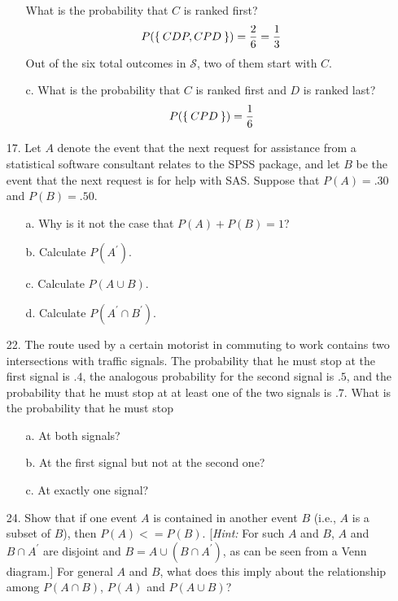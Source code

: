 \documentclass[letterpaper,12pt]{article}
\begin{document}
\begin{enumerate}
\begin{enumerate}
        What is the probability that $C$ is ranked first?
        \begin{align*}
          P(\Set{CDP, CPD}) = \frac{2}{6} = \frac{1}{3}
        \end{align*}
        Out of the six total outcomes in $\mathcal{S}$, two of them start with $C$.
      \item[c.]
        What is the probability that $C$ is ranked first and $D$ is ranked last?
        \begin{align*}
          P(\Set{CPD}) = \frac{1}{6}
        \end{align*}
    \end{enumerate}
  \item[17.]
  Let $A$ denote the event that the next request for assistance from a statistical software consultant relates to the SPSS package, and let $B$ be the event that the next request is for help with SAS. Suppose that $P(A) = .30$ and $P(B) = .50$.
  \begin{enumerate}
      \item[a.]
        Why is it not the case that $P(A) + P(B) = 1$?
      \item[b.]
        Calculate $P(A^\prime)$.
      \item[c.]
        Calculate $P(A\cup B)$.
      \item[d.]
        Calculate $P(A^\prime \cap B^\prime)$.
    \end{enumerate}
  \item[22.]
    The route used by a certain motorist in commuting to work contains two intersections with traffic signals. The probability that he must stop at the first signal is $.4$, the analogous probability for the second signal is $.5$, and the probability that he must stop at at least one of the two signals is $.7$. What is the probability that he must stop
  \begin{enumerate}
      \item[a.]
        At both signals?
      \item[b.]
        At the first signal but not at the second one?
      \item[c.]
        At exactly one signal?
    \end{enumerate}
  \item[24.]
    Show that if one event $A$ is contained in another event $B$ (i.e., $A$ is a subset of $B$), then $P(A) <= P(B)$. [\textit{Hint:} For such $A$ and $B$, $A$ and $B \cap A^\prime$ are disjoint and $B = A \cup (B \cap A^\prime)$, as can be seen from a Venn diagram.] For general $A$ and $B$, what does this imply about the relationship among $P(A \cap B)$, $P(A)$ and $P(A \cup B)$?
\end{enumerate}
\end{document}
